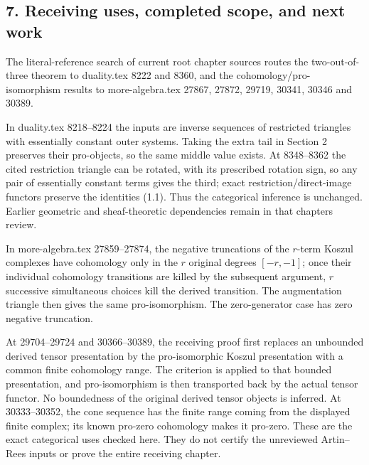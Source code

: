 \documentclass[11pt]{article}
\begin{document}
\subsection{\texorpdfstring{7. Receiving uses,\allowbreak{} completed scope,\allowbreak{} and next work}{7. Receiving  completed  and next work}}\label{proofs-12380-12604-receiving-uses-completed-scope-and-next-work}

The literal-reference search of current root chapter sources routes the two-out-of-three theorem to duality.tex 8222 and 8360,\allowbreak{} and the cohomology/\allowbreak{}pro-isomorphism results to more-algebra.tex 27867,\allowbreak{} 27872,\allowbreak{} 29719,\allowbreak{} 30341,\allowbreak{} 30346 and 30389.

In duality.tex 8218–\allowbreak{}8224 the inputs are inverse sequences of restricted triangles with essentially constant outer systems. Taking the extra tail in Section 2 preserves their pro-objects,\allowbreak{} so the same middle value exists. At 8348–\allowbreak{}8362 the cited restriction triangle can be rotated,\allowbreak{} with its prescribed rotation sign,\allowbreak{} so any pair of essentially constant terms gives the third; exact restriction/\allowbreak{}direct-image functors preserve the identities (1.1)\allowbreak{}. Thus the categorical inference is unchanged. Earlier geometric and sheaf-theoretic dependencies remain in that chapter\textquotesingle s review.

In more-algebra.tex 27859–\allowbreak{}27874,\allowbreak{} the negative truncations of the \(r\)-term Koszul complexes have cohomology only in the \(r\) original degrees \([-r,-1]\); once their individual cohomology transitions are killed by the subsequent argument,\allowbreak{} \(r\) successive simultaneous choices kill the derived transition. The augmentation triangle then gives the same pro-isomorphism. The zero-generator case has zero negative truncation.

At 29704–\allowbreak{}29724 and 30366–\allowbreak{}30389,\allowbreak{} the receiving proof first replaces an unbounded derived tensor presentation by the pro-isomorphic Koszul presentation with a common finite cohomology range. The criterion is applied to that bounded presentation,\allowbreak{} and pro-isomorphism is then transported back by the actual tensor functor. No boundedness of the original derived tensor objects is inferred. At 30333–\allowbreak{}30352,\allowbreak{} the cone sequence has the finite range coming from the displayed finite complex; its known pro-zero cohomology makes it pro-zero. These are the exact categorical uses checked here. They do not certify the unreviewed Artin–\allowbreak{}Rees inputs or prove the entire receiving chapter.
\end{document}
